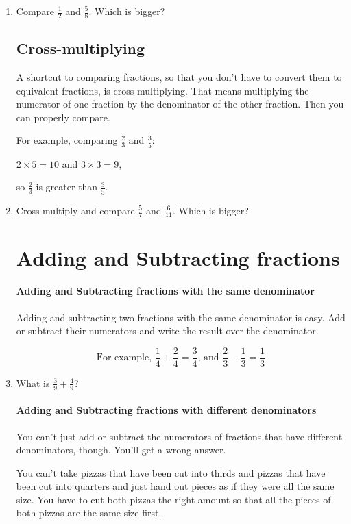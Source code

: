 \documentclass[14pt]{article}
\begin{document}
\begin{enumerate}
\item Compare $\frac{1}{2}$ and $\frac{5}{8}$. Which is bigger?

\subsection*{Cross-multiplying}
A shortcut to comparing fractions, so that you don't have to convert them to equivalent fractions, is cross-multiplying. That means multiplying the numerator of one fraction by the denominator of the other fraction. Then you can properly compare.

\begin{doublespace}
For example, comparing $\frac{2}{3}$ and $\frac{3}{5}$:

$2 \times 5 = 10$ and $3 \times 3 = 9$,

so $\frac{2}{3}$ is greater than $\frac{3}{5}$.
\end{doublespace}

\item Cross-multiply and compare $\frac{5}{7}$ and $\frac{6}{11}$. Which is bigger?

\section{Adding and Subtracting fractions}
\paragraph{Adding and Subtracting fractions with the same denominator}
Adding and subtracting two fractions with the same denominator is easy. Add or subtract their numerators and write the result over the denominator.

$$\text{For example, }\frac{1}{4} + \frac{2}{4} = \frac{3}{4}\text{, and }\frac{2}{3} - \frac{1}{3} = \frac{1}{3}$$

\item What is $\frac{3}{9}+\frac{4}{9}$?\\

\paragraph{Adding and Subtracting fractions with different denominators}
You can't just add or subtract the numerators of fractions that have different denominators, though. You'll get a wrong answer.

You can't take pizzas that have been cut into thirds and pizzas that have been cut into quarters and just hand out pieces as if they were all the same size. You have to cut both pizzas the right amount so that all the pieces of both pizzas are the same size first.


\end{enumerate}
\end{document}
